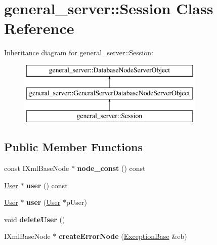 \hypertarget{classgeneral__server_1_1Session}{\section{general\-\_\-server\-:\-:\-Session \-Class \-Reference}
\label{classgeneral__server_1_1Session}
}
\-Inheritance diagram for general\-\_\-server\-:\-:\-Session\-:\begin{figure}[H]
\begin{center}
\leavevmode
\includegraphics[height=3.000000cm]{classgeneral__server_1_1Session}
\end{center}
\end{figure}
\subsection*{\-Public \-Member \-Functions}
\begin{DoxyCompactItemize}
\item 
\hypertarget{classgeneral__server_1_1Session_a6d28c76b6b64197510b44dcf7b2cba0a}{const \-I\-Xml\-Base\-Node $\ast$ {\bfseries node\-\_\-const} () const }\label{classgeneral__server_1_1Session_a6d28c76b6b64197510b44dcf7b2cba0a}

\item 
\hypertarget{classgeneral__server_1_1Session_a95ac6b1caba09c0b5e65a5d5af7bec04}{\hyperlink{classgeneral__server_1_1User}{\-User} $\ast$ {\bfseries user} () const }\label{classgeneral__server_1_1Session_a95ac6b1caba09c0b5e65a5d5af7bec04}

\item 
\hypertarget{classgeneral__server_1_1Session_ac72644b0382c269b7688d325fcc21a7c}{\hyperlink{classgeneral__server_1_1User}{\-User} $\ast$ {\bfseries user} (\hyperlink{classgeneral__server_1_1User}{\-User} $\ast$p\-User)}\label{classgeneral__server_1_1Session_ac72644b0382c269b7688d325fcc21a7c}

\item 
\hypertarget{classgeneral__server_1_1Session_ac4e0e0c730afb4d8aabc0a5e8df60d47}{void {\bfseries delete\-User} ()}\label{classgeneral__server_1_1Session_ac4e0e0c730afb4d8aabc0a5e8df60d47}

\item 
\hypertarget{classgeneral__server_1_1Session_af65757d966ae32a2d5fcd894056abfd2}{\-I\-Xml\-Base\-Node $\ast$ {\bfseries create\-Error\-Node} (\hyperlink{classgeneral__server_1_1ExceptionBase}{\-Exception\-Base} \&eb)}\label{classgeneral__server_1_1Session_af65757d966ae32a2d5fcd894056abfd2}

\end{DoxyCompactItemize}
